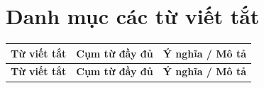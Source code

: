 \chapter*{Danh mục các từ viết tắt}

\renewcommand{\arraystretch}{1.3} 
\setlength{\tabcolsep}{6pt} 

\begin{longtable}{|p{2cm}|p{5.5cm}|p{6.5cm}|}
\hline
\textbf{Từ viết tắt} & \textbf{Cụm từ đầy đủ} & \textbf{Ý nghĩa / Mô tả} \\
\hline
\endfirsthead

\hline
\textbf{Từ viết tắt} & \textbf{Cụm từ đầy đủ} & \textbf{Ý nghĩa / Mô tả} \\
\hline
\endhead


\end{longtable}
